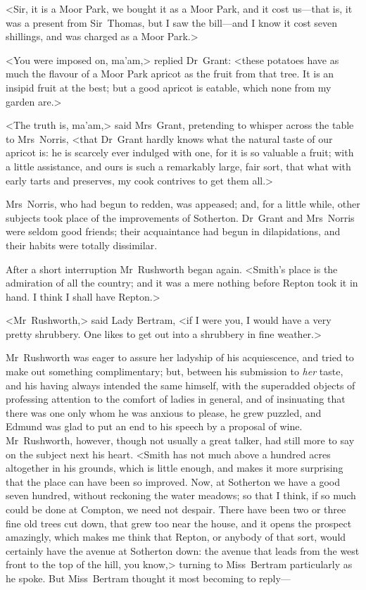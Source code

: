 <Sir, it is a Moor Park, we bought it as a Moor Park, and it cost us—that is, it was a present from Sir~Thomas, but I saw the bill—and I know it cost seven shillings, and was charged as a Moor Park.>

<You were imposed on, ma'am,> replied Dr~Grant: <these potatoes have as much the flavour of a Moor Park apricot as the fruit from that tree. It is an insipid fruit at the best; but a good apricot is eatable, which none from my garden are.>

<The truth is, ma'am,> said Mrs~Grant, pretending to whisper across the table to Mrs~Norris, <that Dr~Grant hardly knows what the natural taste of our apricot is: he is scarcely ever indulged with one, for it is so valuable a fruit; with a little assistance, and ours is such a remarkably large, fair sort, that what with early tarts and preserves, my cook contrives to get them all.>

Mrs~Norris, who had begun to redden, was appeased; and, for a little while, other subjects took place of the improvements of Sotherton. Dr~Grant and Mrs~Norris were seldom good friends; their acquaintance had begun in dilapidations, and their habits were totally dissimilar.

After a short interruption Mr~Rushworth began again. <Smith's place is the admiration of all the country; and it was a mere nothing before Repton took it in hand. I think I shall have Repton.>

<Mr~Rushworth,> said Lady Bertram, <if I were you, I would have a very pretty shrubbery. One likes to get out into a shrubbery in fine weather.>

Mr~Rushworth was eager to assure her ladyship of his acquiescence, and tried to make out something complimentary; but, between his submission to \textit{her}  taste, and his having always intended the same himself, with the superadded objects of professing attention to the comfort of ladies in general, and of insinuating that there was one only whom he was anxious to please, he grew puzzled, and Edmund was glad to put an end to his speech by a proposal of wine. Mr~Rushworth, however, though not usually a great talker, had still more to say on the subject next his heart. <Smith has not much above a hundred acres altogether in his grounds, which is little enough, and makes it more surprising that the place can have been so improved. Now, at Sotherton we have a good seven hundred, without reckoning the water meadows; so that I think, if so much could be done at Compton, we need not despair. There have been two or three fine old trees cut down, that grew too near the house, and it opens the prospect amazingly, which makes me think that Repton, or anybody of that sort, would certainly have the avenue at Sotherton down: the avenue that leads from the west front to the top of the hill, you know,> turning to Miss~Bertram particularly as he spoke. But Miss~Bertram thought it most becoming to reply—

